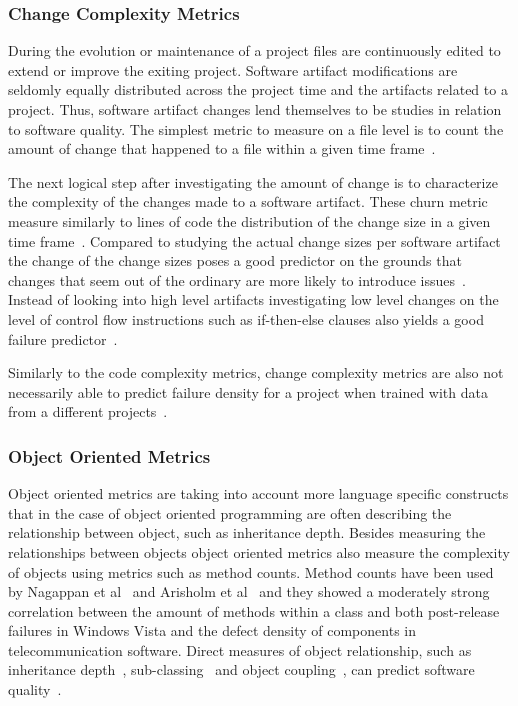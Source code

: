 \subsubsection{Change Complexity Metrics}
During the evolution or maintenance of a project files are continuously edited to extend or improve the exiting project.
Software artifact modifications are seldomly equally distributed across the project time and the artifacts related to a project.
Thus, software artifact changes lend themselves to be studies in relation to software quality.
The simplest metric to measure on a file level is to count the amount of change that happened to a file within a given time frame~\cite{li:metrics:2005,moser:icse:2008,cataldo:icse:2011}.

The next logical step after investigating the amount of change is to characterize the complexity of the changes made to a software artifact. 
These churn metric measure similarly to lines of code the distribution of the change size in a given time frame~\cite{nagappan:icse:2005,shihab:fse:2011,zimmermann:fse:2009,bell:promise:2011}.
Compared to studying the actual change sizes per software artifact the change of the change sizes poses a good predictor on the grounds that changes that seem out of the ordinary are more likely to introduce issues~\cite{hassan:icse:2009}.
Instead of looking into high level artifacts investigating low level changes on the level of control flow instructions such as if-then-else clauses also yields a good failure predictor~\cite{giger:msr:2011}.

Similarly to the code complexity metrics, change complexity metrics are also not necessarily able to predict failure density for a project when trained with data from a different projects~\cite{zimmermann:fse:2009}.


\subsubsection{Object Oriented Metrics}
\label{chap:6:sub:oom}
Object oriented metrics are taking into account more language specific constructs that in the case of object oriented programming are often describing the relationship between object, such as inheritance depth.
Besides measuring the relationships between objects object oriented metrics also measure the complexity of objects using metrics such as method counts.
Method counts have been used by Nagappan et al~\cite{nagappan:icse:2006} and Arisholm et al~\cite{arisholm:isese:2006} and they showed a moderately strong correlation between the amount of methods within a class and both post-release failures in Windows Vista and the defect density of components in telecommunication software.
%
Direct measures of object relationship, such as inheritance depth~\cite{chidamber:tse:1994}, sub-classing~\cite{chidamber:tse:1994} and object coupling~\cite{chidamber:tse:1994}, can predict software quality~\cite{nagappan:icse:2006,arisholm:isese:2006,english:promise:2009}.



